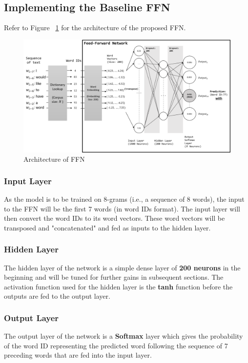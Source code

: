 \documentclass[sigconf,nonacm=true]{acmart}
\begin{document}
\subsection{Implementing the Baseline FFN}

Refer to Figure ~\ref{fig:ffnarch} for the architecture of the proposed FFN.

\begin{figure}
	\centering
	\includegraphics[scale=0.52]{figures/ffn.png}
	\caption{Architecture of FFN}
	\label{fig:ffnarch}
	
\end{figure}


\subsubsection{Input Layer}
As the model is to be trained on 8-grams (i.e., a sequence of 8 words),
the input to the FFN will be the first 7 words (in word IDs format). The
input layer will then convert the word IDs to its word vectors.
These word vectors will be transposed and "concatenated" and fed as 
inputs to the hidden layer.

\subsubsection{Hidden Layer}
The hidden layer of the network is a simple dense layer of 
\textbf{200 neurons} in the beginning and will be tuned for further gains 
in subsequent sections. The activation function used for the hidden layer 
is the \textbf{tanh} function before the outputs are fed to the output layer.

\subsubsection{Output Layer}
The output layer of the network is a \textbf{Softmax} layer which gives 
the probability of the word ID representing the predicted word following 
the sequence of 7 preceding words that are fed into the input layer.
\end{document}
